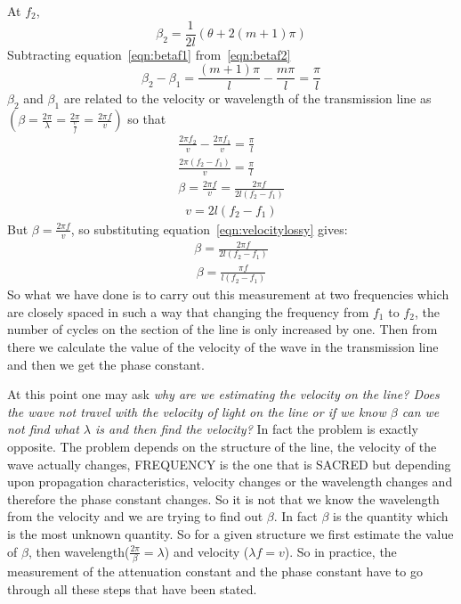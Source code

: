 At $f_2$,
\begin{equation}
\beta_2 = \frac{1}{2l}(\theta + 2(m + 1)\pi)
\label{eqn:betaf2}
\end{equation}
Subtracting equation~\eqref{eqn:betaf1} from~\eqref{eqn:betaf2}
\begin{dmath*}
\beta_2 - \beta_1 = \frac{(m + 1)\pi}{l} - \frac{m\pi}{l}
= \frac{\pi}{l}
\end{dmath*}
$\beta_2$ and $\beta_1$ are related to the velocity or wavelength of the transmission line as $( \beta = \frac{2\pi}{\lambda} = \frac{2\pi}{\frac{v}{f}} = \frac{2\pi f}{v})$ so that
\begin{align*}
\frac{2\pi f_2}{v} - \frac{2\pi f_1}{v} = \frac{\pi}{l}\\
\frac{2\pi(f_2 - f_1)}{v} = \frac{\pi}{l}\\
\beta = \frac{2\pi f}{v} = \frac{2\pi f}{2l(f_2 - f_1)}
\end{align*}
\begin{align}
v = 2l(f_2-f_1)
\label{eqn:velocitylossy}
\end{align}
But $\beta = \frac{2\pi f}{v}$, so substituting equation~\eqref{eqn:velocitylossy} gives:
\begin{align*}
\beta = \frac{2\pi f}{2l(f_2 - f_1)}
\end{align*}
\begin{align}
\beta = \frac{\pi f}{l(f_2 - f_1)}
\end{align}
So what we have done is to carry out this measurement at two frequencies which are closely spaced in such a way that changing the frequency from $f_1$ to $f_2$, the number of cycles on the section of the line is only increased by one. Then from there we calculate the value of the velocity of the wave in the transmission line and then we get the phase constant.

At this point one may ask \emph{why are we estimating the velocity on the line? Does the wave not travel with the velocity of light on the line or if we know $\beta$ can we not find what $\lambda$ is and then find the velocity?} In fact the problem is exactly opposite. The problem depends on the structure of the line, the velocity of the wave actually changes, FREQUENCY is the one that is SACRED but depending upon propagation characteristics, velocity changes or the wavelength changes and therefore the phase constant changes. So it is not that we know the wavelength from the velocity and we are trying to find out $\beta$. In fact $\beta$ is the quantity which is the most unknown quantity. So for a given structure we first estimate the value of $\beta$, then wavelength($\frac{2\pi}{\beta}= \lambda$) and velocity ($\lambda f = v$). So in practice, the measurement of the attenuation constant and the phase constant have to go through all these steps that have been stated.

